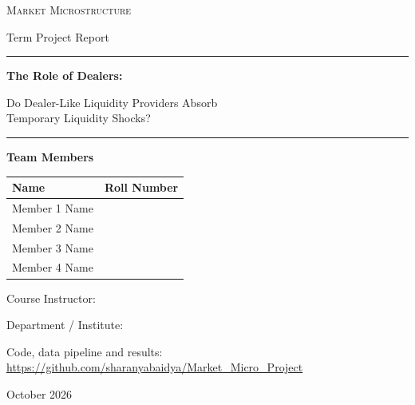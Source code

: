 \documentclass[11pt,a4paper]{article}
\begin{document}
\begin{titlepage}
\centering
\vspace*{1.2cm}
{\large\scshape Market Microstructure\par}
{\large Term Project Report\par}
\vspace{2.2cm}
\rule{\textwidth}{0.8pt}\par\vspace{0.5cm}
{\LARGE\bfseries The Role of Dealers:\par}
\vspace{0.25cm}
{\Large Do Dealer-Like Liquidity Providers Absorb\\ Temporary Liquidity Shocks?\par}
\vspace{0.4cm}
\rule{\textwidth}{0.8pt}\par
\vspace{2.2cm}

{\large\bfseries Team Members\par}
\vspace{0.4cm}
\begin{tabular}{ll}
\toprule
\textbf{Name} & \textbf{Roll Number} \\
\midrule
Member 1 Name & \hspace{3cm} \\
Member 2 Name & \\
Member 3 Name & \\
Member 4 Name & \\
\bottomrule
\end{tabular}

\vspace{2cm}
{\large Course Instructor: \underline{\hspace{6cm}}\par}
\vspace{0.4cm}
{\large Department / Institute: \underline{\hspace{6cm}}\par}
\vfill
{\normalsize Code, data pipeline and results: \url{https://github.com/sharanyabaidya/Market_Micro_Project}\par}
\vspace{0.3cm}
{\large October 2026\par}
\end{titlepage}

\tableofcontents
\vspace{0.6cm}
\end{document}
